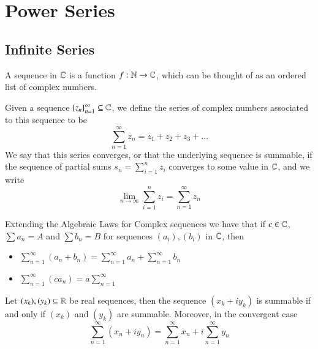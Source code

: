 \documentclass[12pt, a4paper, oneside, openright, titlepage]{book}
\begin{document}
\chapter{Power Series}


\section{Infinite Series}


\begin{defn}
    A sequence in $\mathbb C$ is a function $f:\mathbb N\rightarrow \mathbb C$, which can be thought of as an ordered list of complex numbers.
\end{defn}

\begin{defn}
    Given a sequence $\{z_n\}_{n=1}^{\infty}\subseteq \mathbb C$, we define the series of complex numbers associated to this sequence to be \begin{equation*}
        \sum_{n=1}^{\infty}z_n = z_1+z_2+z_3+...
    \end{equation*}
    We say that this series converges, or that the underlying sequence is summable, if the sequence of partial sums $s_n = \sum_{i=1}^nz_i$ converges to some value in $\mathbb C$, and we write \begin{equation*}
        \lim\limits_{n\rightarrow \infty}\sum_{i=1}^nz_i = \sum_{n=1}^{\infty}z_n
    \end{equation*}
\end{defn}

\begin{prop}
    Extending the Algebraic Laws for Complex sequences we have that if $c \in \mathbb C$, $\sum a_n = A$ and $\sum b_n = B$ for sequences $(a_i),(b_i)$ in $\mathbb C$, then \begin{itemize}
        \item $\sum_{n=1}^{\infty}(a_n+b_n) = \sum_{n=1}^{\infty}a_n+\sum_{n=1}^{\infty}b_n$
        \item $\sum_{n=1}^{\infty}(ca_n) = a\sum_{n=1}^{\infty}$
    \end{itemize}
\end{prop}


\begin{thm}
    Let $(x_k),(y_k) \subseteq \mathbb R$ be real sequences, then the sequence $(x_k+iy_k)$ is summable if and only if $(x_k)$ and $(y_k)$ are summable. Moreover, in the convergent case \begin{equation*}
        \sum_{n=1}^{\infty}(x_n+iy_n) = \sum_{n=1}^{\infty}x_n+i\sum_{n=1}^{\infty}y_n
    \end{equation*}
\end{thm}
\end{document}
